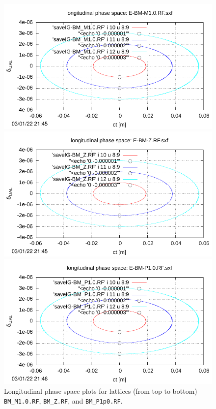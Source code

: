 \documentclass[]{article}
\begin{document}
%
\begin{figure}[h]
\begin{minipage}{\linewidth}
\centering
\includegraphics[scale=0.9]{pdf/BM-III_Figure4t.pdf}
\end{minipage}
%
\begin{minipage}{\linewidth}
\centering
\includegraphics[scale=0.9]{pdf/BM-III_Figure4m.pdf}
\end{minipage}
%
\begin{minipage}{\linewidth}
\centering
\includegraphics[scale=0.9]{pdf/BM-III_Figure4b.pdf}
\end{minipage}
\caption{\label{fig:LongitPhSp_BMs}
Longitudinal phase space plots for 
lattices (from top to bottom)
{\tt BM\_M1.0.RF}, {\tt BM\_Z.RF}, and {\tt BM\_P1p0.RF}.
}
\end{figure}
%
\end{document}
